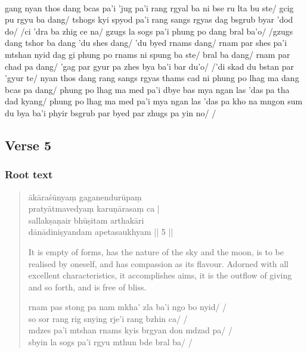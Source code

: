 \documentclass[12pt]{article}
\begin{document}
\textbf{\TVB}\\
gang nyan thos dang bcas pa'i 'jug pa'i rang rgyal ba ni bse ru lta bu ste/ gcig pu rgyu ba dang/ tshogs kyi spyod pa'i rang sangs rgyas dag bsgrub byar 'dod do/ /ci 'dra ba zhig ce na/ gzugs la sogs pa'i phung po dang bral ba'o/ /gzugs dang tshor ba dang 'du shes dang/ 'du byed rnams dang/ rnam par shes pa'i mtshan nyid dag gi phung po rnams ni spung ba ste/ bral ba dang/ rnam par chad pa dang/ 'gag par gyur pa zhes bya ba'i bar du'o/ /'di skad du bstan par 'gyur te/ nyan thos dang rang sangs rgyas thams cad ni phung po lhag ma dang bcas pa dang/ phung po lhag ma med pa'i dbye bas mya ngan las 'das pa tha dad kyang/ phung po lhag ma med pa'i mya ngan las 'das pa kho na mngon sum du bya ba'i phyir bsgrub par byed par zhugs pa yin no/ /

\subsection{Verse 5}
\subsubsection{Root text}
\begin{quote}
	ākāraśūnyaṃ gaganendurūpaṃ \\
	pratyātmavedyaṃ karuṇārasaṃ ca |\\
	sallakṣaṇair bhūṣitam\footnoteB{
		bhūṣitam] \EDD ; bhuṣitam \MS
	} arthakāri \\
	dānādiniṣyandam apetasaukhyam || 5 ||

	It is empty of forms, has the nature of the sky and the moon, is to be realised by oneself, and has compassion as its flavour.
	Adorned with all excellent characteristics, it accomplishes aims, it is the outflow of giving and so forth, and is free of bliss.

	rnam pas stong pa nam mkha' zla ba'i ngo bo nyid/ /\\
	so sor rang rig snying rje'i rang bzhin ca/ /\\
	mdzes pa'i mtshan rnams kyis brgyan don mdzad pa/ /\\
	sbyin la sogs pa'i rgyu mthun bde bral ba/ /
\end{quote}
\end{document}
